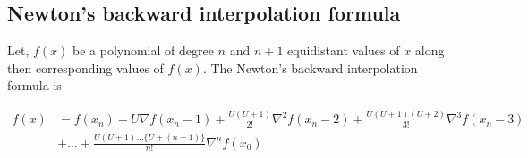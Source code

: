 \documentclass{article}
\begin{document}
                
                
                
              
              \subsection{Newton's backward interpolation formula}
                Let, $f(x)$ be a polynomial  of degree $n$ and $n+1$ equidistant values of $x$ along then
                corresponding values of $f(x)$. The Newton's backward interpolation formula is

                \begin{align*}
                  f(x) &= f(x_n)+U\nabla f(x_n-1)+\frac{U(U+1)}{2!}\nabla^2f(x_n-2)+\frac{U(U+1)(U+2)}{3!}\nabla^3f(x_n-3)\\
                       &+\dots+\frac{U(U+1)\dots\{U+(n-1)\}}{n!}\nabla^nf(x_0)
                \end{align*}
              
\end{document}
